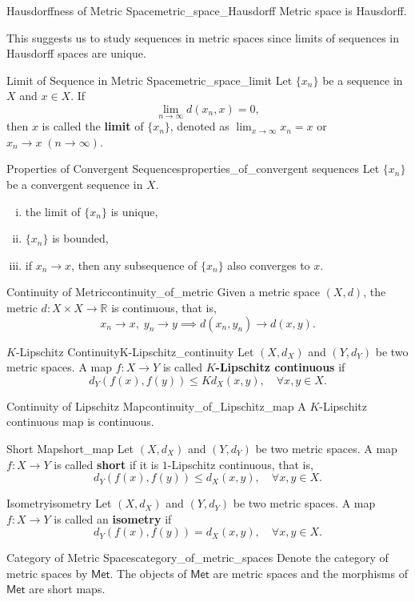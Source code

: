 \documentclass{report}
\begin{document}
\begin{proposition}{Hausdorffness of Metric Space}{metric_space_Hausdorff}
	Metric space is Hausdorff.
\end{proposition}
This suggests us to study sequences in metric spaces since limits of sequences in Hausdorff spaces are unique.
\begin{definition}{Limit of Sequence in Metric Space}{metric_space_limit}
	Let $\{x_n\}$ be a sequence in $X$ and $x\in X$. If
	\[
		\lim_{n\to\infty}d(x_n,x)=0,
	\]
	then $x$ is called the \textbf{limit} of $\{x_n\}$, denoted as $\lim_{x\to\infty}x_n=x$ or $x_n\to x\;(n\to\infty)$.
\end{definition}

\begin{proposition}{Properties of Convergent Sequences}{properties_of_convergent sequences}
	Let $\{x_n\}$ be a convergent sequence in $X$.
	\begin{enumerate}[(i)]
		\item the limit of $\{x_n\}$ is unique,
		\item $\{x_n\}$ is bounded,
		\item if $x_n\to x$, then any subsequence of $\{x_n\}$ also converges to $x$.
	\end{enumerate}
\end{proposition}

\begin{proposition}{Continuity of Metric}{continuity_of_metric}
	Given a metric space $(X,d)$, the metric $d:X\times X\to \mathbb{R}$ is continuous, that is,
	\[
		x_n\to x,\; y_n\to y\implies d(x_n,y_n)\to d(x,y).
	\]
\end{proposition}
\begin{definition}{$K$-Lipschitz Continuity}{K-Lipschitz_continuity}
	Let $(X,d_X)$ and $(Y,d_Y)$ be two metric spaces. A map $f:X\to Y$ is called \textbf{$K$-Lipschitz continuous} if
	\[
		d_Y(f(x),f(y))\le Kd_X(x,y),\quad\forall x,y\in X.
	\]
\end{definition}
\begin{proposition}{Continuity of Lipschitz Map}{continuity_of_Lipschitz_map}
	A $K$-Lipschitz continuous map is continuous.
\end{proposition}
\begin{definition}{Short Map}{short_map}
	Let $(X,d_X)$ and $(Y,d_Y)$ be two metric spaces. A map $f:X\to Y$ is called \textbf{short} if it is $1$-Lipschitz continuous, that is,
	\[
		d_Y(f(x),f(y))\le d_X(x,y),\quad\forall x,y\in X.
	\]
\end{definition}
\begin{definition}{Isometry}{isometry}
	Let $(X,d_X)$ and $(Y,d_Y)$ be two metric spaces. A map $f:X\to Y$ is called an \textbf{isometry} if
	\[
		d_Y(f(x),f(y))=d_X(x,y),\quad\forall x,y\in X.
	\]
\end{definition}
\begin{definition}{Category of Metric Spaces}{category_of_metric_spaces}
	Denote the category of metric spaces by $\mathsf{Met}$. The objects of $\mathsf{Met}$ are metric spaces and the morphisms of $\mathsf{Met}$ are short maps.
\end{definition}
\end{document}
